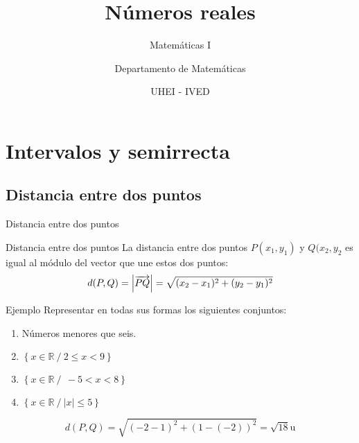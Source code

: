 \documentclass[8pt]{beamer}
\title{Números reales}
\subtitle{Matemáticas I}
\author{Departamento de Matemáticas}
\date{ UHEI - IVED}
\begin{document}
\titleframe

\begin{frame}
\tableofcontents
\end{frame}

\section{Intervalos y semirrecta}
\subsection{Distancia entre dos puntos}

\begin{frame}[t]{Distancia entre dos puntos}
\begin{alertblock}{Distancia entre dos puntos}
La distancia entre dos puntos $P(x_1,y_1)$ y $Q(x_2,y_2$ es igual al módulo del vector que une estos dos puntos:
\[ d(P,Q)= \left| \overrightarrow{PQ} \right| = \sqrt{(x_2-x_1)^2+(y_2-y_1)^2} \]
\end{alertblock}

\pause

\begin{exampleblock}{Ejemplo}
Representar en todas sus formas los siguientes conjuntos:


\begin{enumerate}

\item
  Números menores que seis.
\item
  \(\left\{ x\mathbb{\in R\ /\ }2 \leq x < 9 \right\}\)
\item
  \(\left\{ x\mathbb{\in R\ /\ \  -}5 < x < 8 \right\}\)
\item
  \(\left\{ x\mathbb{\in R\ /\ }|x| \leq 5 \right\}\)
\end{enumerate}
\end{exampleblock}

\pause

\[d(P,Q)=\sqrt{(-2-1)^2+ (1-(-2))^2}= \sqrt{18} \text{u} \]
\end{frame}
\end{document}
